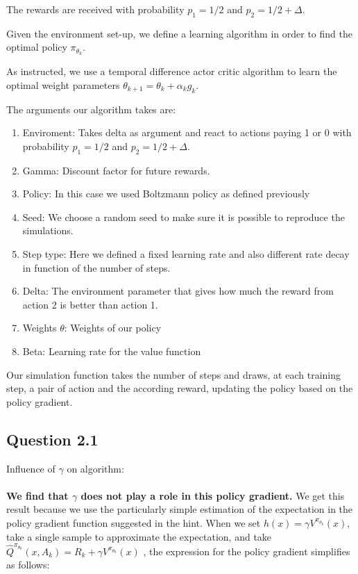 \documentclass[a4paper, 11pt]{article} %
\begin{document}
The rewards are received with probability $p_{1}=1 / 2$ and $p_{2}=1 / 2+\Delta$. 

Given the environment set-up, we define a learning algorithm in order to find the optimal policy $\pi_{\theta_{k}}$.  

As instructed, we use a temporal difference actor critic algorithm to learn the optimal weight parameters $\theta_{k+1}=\theta_{k}+\alpha_{k} g_{k}$.

The arguments our algorithm takes are:

\begin{enumerate}
	\item Enviroment: Takes delta as argument and react to actions paying 1 or 0 with probability $p_{1}=1 / 2$ and $p_{2}=1 / 2+\Delta$. 
	\item Gamma: Discount factor for future rewards. 
	\item Policy: In this case we used Boltzmann policy as defined previously
	\item Seed: We choose a random seed to make sure it is possible to reproduce the simulations.  
	\item Step type: Here we defined a fixed learning rate and also different rate decay in function of the number of steps.
	\item Delta: The environment parameter that gives how much the reward from action 2 is better than action 1.
	\item Weights $\theta$: Weights of our policy
	\item Beta: Learning rate for the value function
\end{enumerate}

Our simulation function takes the number of steps and draws, at each training step, a pair of action and the according reward, updating the policy based on the policy gradient.

\subsection*{Question 2.1}

Influence of $\gamma$ on algorithm:
\\
\\
\textbf{We find that $\gamma$ does not play a role in this policy gradient.} We get this result because we use the particularly simple estimation of the expectation in the policy gradient function suggested in the hint. When we set $h(x)=\gamma V^{\pi_{\theta_{k}}}(x)$, take a single sample to approximate the expectation, and take $\widehat{Q}^{\pi_{\theta_{k}}}\left(x, A_{k}\right)=R_{k}+\gamma V^{\pi_{\theta_{k}}}(x)$ , the expression for the policy gradient simplifies as follows:
\end{document}
